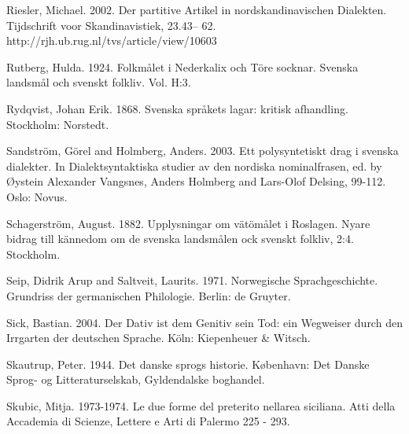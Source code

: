 Riesler, Michael. 2002. Der partitive Artikel in nordskandinavischen Dialekten. Tijdschrift voor Skandinavistiek, 23.43– 62. http://rjh.ub.rug.nl/tvs/article/view/10603


Rutberg, Hulda. 1924. Folkmålet i Nederkalix och Töre socknar. Svenska landsmål och svenskt folkliv. Vol. H:3.


Rydqvist, Johan Erik. 1868. Svenska språkets lagar: kritisk afhandling. Stockholm: Norstedt.


Sandström, Görel and Holmberg, Anders. 2003. Ett polysyntetiskt drag i svenska dialekter. In Dialektsyntaktiska studier av den nordiska nominalfrasen, ed. by Øystein Alexander Vangsnes, Anders Holmberg and Lars-Olof Delsing, 99-112. Oslo: Novus.


Schagerström, August. 1882. Upplysningar om vätömålet i Roslagen. Nyare bidrag till kännedom om de svenska landsmålen ock svenskt folkliv, 2:4. Stockholm.


Seip, Didrik Arup and Saltveit, Laurits. 1971. Norwegische Sprachgeschichte. Grundriss der germanischen Philologie. Berlin: de Gruyter.


Sick, Bastian. 2004. Der Dativ ist dem Genitiv sein Tod: ein Wegweiser durch den Irrgarten der deutschen Sprache. Köln: Kiepenheuer \& Witsch.


Skautrup, Peter. 1944. Det danske sprogs historie. København: Det Danske Sprog- og Litteraturselskab, Gyldendalske boghandel.


Skubic, Mitja. 1973-1974. Le due forme del preterito nell{\textquotesingle}area siciliana. Atti della Accademia di Scienze, Lettere e Arti di Palermo 225 - 293.


